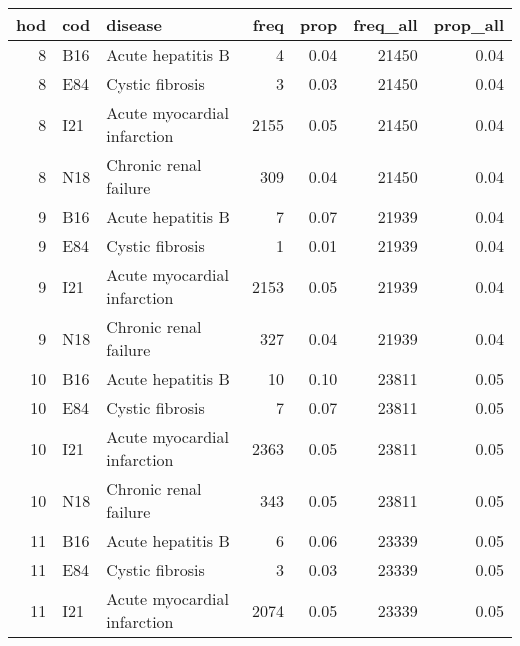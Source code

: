 \begin{tabular}{rllrrrr}
  \toprule
 hod & cod & disease & freq & prop & freq\_all & prop\_all \\ 
  \midrule
    8 & B16 & Acute hepatitis B &   4 & 0.04 & 21450 & 0.04 \\ 
    8 & E84 & Cystic fibrosis &   3 & 0.03 & 21450 & 0.04 \\ 
    8 & I21 & Acute myocardial infarction & 2155 & 0.05 & 21450 & 0.04 \\ 
    8 & N18 & Chronic renal failure & 309 & 0.04 & 21450 & 0.04 \\ 
    9 & B16 & Acute hepatitis B &   7 & 0.07 & 21939 & 0.04 \\ 
    9 & E84 & Cystic fibrosis &   1 & 0.01 & 21939 & 0.04 \\ 
    9 & I21 & Acute myocardial infarction & 2153 & 0.05 & 21939 & 0.04 \\ 
    9 & N18 & Chronic renal failure & 327 & 0.04 & 21939 & 0.04 \\ 
   10 & B16 & Acute hepatitis B &  10 & 0.10 & 23811 & 0.05 \\ 
   10 & E84 & Cystic fibrosis &   7 & 0.07 & 23811 & 0.05 \\ 
   10 & I21 & Acute myocardial infarction & 2363 & 0.05 & 23811 & 0.05 \\ 
   10 & N18 & Chronic renal failure & 343 & 0.05 & 23811 & 0.05 \\ 
   11 & B16 & Acute hepatitis B &   6 & 0.06 & 23339 & 0.05 \\ 
   11 & E84 & Cystic fibrosis &   3 & 0.03 & 23339 & 0.05 \\ 
   11 & I21 & Acute myocardial infarction & 2074 & 0.05 & 23339 & 0.05 \\ 
   \bottomrule
\end{tabular}
